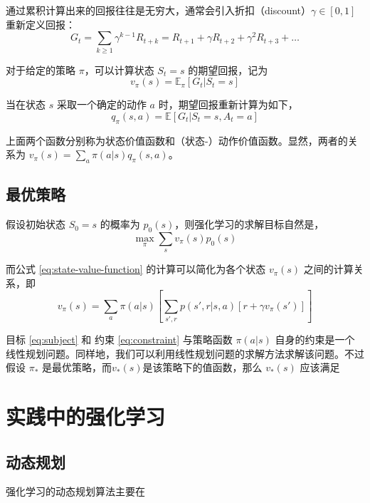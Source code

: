 通过累积计算出来的回报往往是无穷大，通常会引入折扣（discount）$\gamma \in [0,1]$ 重新定义回报：
\begin{equation}
    G_t = \sum_{k \geq 1} \gamma^{k-1} R_{t+k} = R_{t+1} + \gamma R_{t+2} + \gamma^2 R_{t+3} + \dots
    \label{eq:return}
\end{equation}

对于给定的策略 $\pi$，可以计算状态 $S_t = s$ 的期望回报，记为
\begin{equation}
    v_\pi (s) = \mathbb{E}_\pi [G_t | S_t = s]
    \label{eq:state-value-function}
\end{equation}

当在状态 $s$ 采取一个确定的动作 $a$ 时，期望回报重新计算为如下，
\begin{equation}
    q_\pi(s, a) = \mathbb{E} [G_t | S_t = s, A_t = a] 
    \label{eq:action-value-function}
\end{equation}

上面两个函数分别称为状态价值函数和（状态-）动作价值函数。显然，两者的关系为 $ v_\pi(s) = \sum_{a} \pi(a|s) q_{\pi} (s, a)$。

\subsection{最优策略}
假设初始状态 $S_0 = s$ 的概率为 $p_0(s)$，则强化学习的求解目标自然是，
\begin{equation}
    \max_\pi \sum_s v_\pi(s) p_0(s)
    \label{eq:subject}
\end{equation}

而公式 \ref{eq:state-value-function} 的计算可以简化为各个状态 $v_\pi(s)$ 之间的计算关系，即
\begin{equation}
    v_\pi (s) = \sum_a \pi(a|s) \left[ \sum_{s', r} p(s', r | s, a)  [r + \gamma v_\pi(s')] \right]
    \label{eq:constraint}
\end{equation}

目标 \ref{eq:subject} 和 约束 \ref{eq:constraint} 与策略函数 $\pi(a|s)$ 自身的约束是一个线性规划问题。同样地，我们可以利用线性规划问题的求解方法求解该问题。不过假设 $\pi_*$ 是最优策略，而$v_*(s)$是该策略下的值函数，那么 $v_*(s)$ 应该满足

\section{实践中的强化学习}
\subsection{动态规划}
强化学习的动态规划算法主要在

